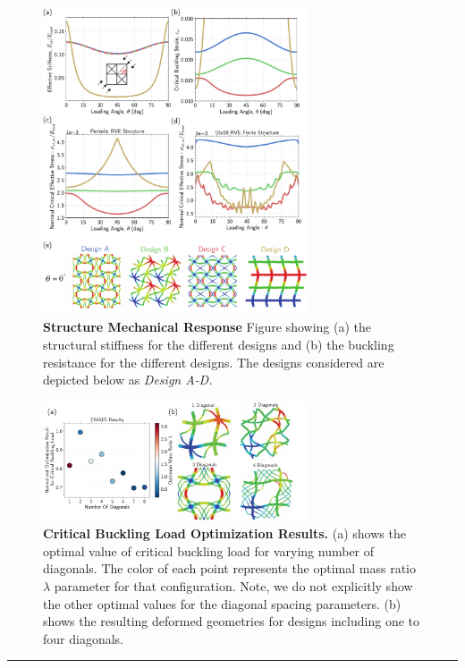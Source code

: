\documentclass[9pt,twocolumn,twoside]{fernandes_paper}
\begin{document}
\begin{figure}[!htb]
	\centering
	\captionsetup{width=0.8\textwidth}
	\includegraphics[width=0.7\textwidth]{Fig3}
	\caption{\textbf{Structure Mechanical Response} Figure showing (a) the structural stiffness for the different designs and (b) the buckling resistance for the different designs. The designs considered are depicted below as \emph{Design A-D.}} \label{Fig3}
\end{figure}

\begin{figure}[!htb]
	\centering
	\captionsetup{width=0.8\textwidth}
	\includegraphics[width=0.7\textwidth]{Fig4}
	\caption{\textbf{Critical Buckling Load Optimization Results.} (a) shows the optimal value of critical buckling load for varying number of diagonals. The color of each point represents the optimal mass ratio $\lambda$  parameter for that configuration.  Note, we do not explicitly show the other optimal values for the diagonal spacing parameters. (b) shows the resulting deformed geometries for designs including one to four diagonals.} \label{Fig4}
\end{figure}

\noindent\rule[-1.5ex]{\linewidth}{1pt}

%
%

\end{document}
